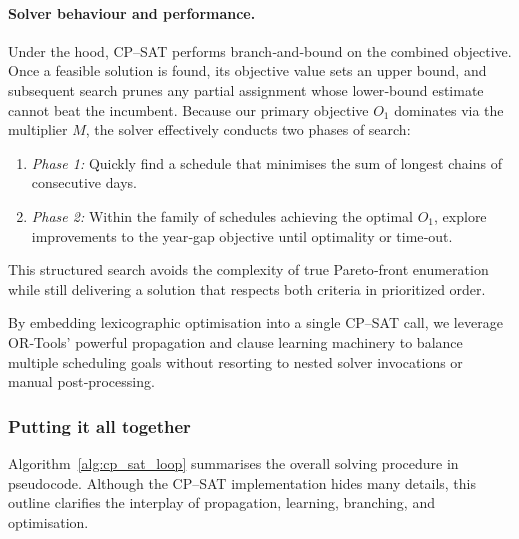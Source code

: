 \documentclass[12pt]{article}
\begin{document}
\paragraph{Solver behaviour and performance.}
Under the hood, CP–SAT performs branch‐and‐bound on the combined objective. Once a feasible solution is found, its objective value sets an upper bound, and subsequent search prunes any partial assignment whose lower‐bound estimate cannot beat the incumbent. Because our primary objective \(O_1\) dominates via the multiplier \(M\), the solver effectively conducts two phases of search:
\begin{enumerate}
  \item {\em Phase 1:} Quickly find a schedule that minimises the sum of longest chains of consecutive days.  
  \item {\em Phase 2:} Within the family of schedules achieving the optimal \(O_1\), explore improvements to the year‐gap objective until optimality or time‐out.
\end{enumerate}
This structured search avoids the complexity of true Pareto‐front enumeration while still delivering a solution that respects both criteria in prioritized order.

\bigskip
By embedding lexicographic optimisation into a single CP–SAT call, we leverage OR‐Tools’ powerful propagation and clause learning machinery to balance multiple scheduling goals without resorting to nested solver invocations or manual post‐processing.




\subsubsection*{Putting it all together}
Algorithm~\ref{alg:cp_sat_loop} summarises the overall solving procedure in pseudocode. Although the CP–SAT implementation hides many details, this outline clarifies the interplay of propagation, learning, branching, and optimisation.
\end{document}
